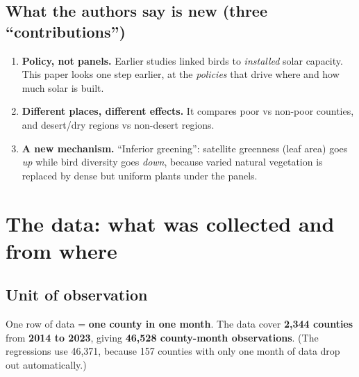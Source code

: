 \documentclass[11pt]{article}
\begin{document}
\subsection{What the authors say is new (three ``contributions'')}
\begin{enumerate}
\item \textbf{Policy, not panels.} Earlier studies linked birds to \emph{installed} solar capacity. This paper looks one step earlier, at the \emph{policies} that drive where and how much solar is built.
\item \textbf{Different places, different effects.} It compares poor vs non-poor counties, and desert/dry regions vs non-desert regions.
\item \textbf{A new mechanism.} ``Inferior greening'': satellite greenness (leaf area) goes \emph{up} while bird diversity goes \emph{down}, because varied natural vegetation is replaced by dense but uniform plants under the panels.
\end{enumerate}

\section{The data: what was collected and from where}

\subsection{Unit of observation}
One row of data = \textbf{one county in one month}. The data cover \textbf{2,344 counties} from \textbf{2014 to 2023}, giving \textbf{46,528 county-month observations}. (The regressions use 46,371, because 157 counties with only one month of data drop out automatically.)
\end{document}
